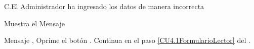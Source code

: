 		\begin{UCtrayectoriaA}{C.}{El Administrador ha ingresado los datos de manera incorrecta}

			\UCpaso Muestra el Mensaje \item Mensaje ,
			\UCpaso[\UCactor] Oprime el botón .
			\UCpaso Continua en el paso \ref{CU4.1FormularioLector} del .

		\end{UCtrayectoriaA}


